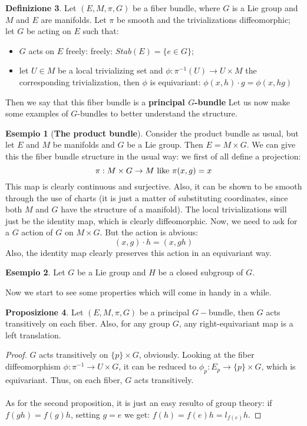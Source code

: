 \documentclass[12pt,a4paper]{report}
\theoremstyle{definition}
\newtheorem{Def}{Definizione}[chapter]
\theoremstyle{Theorem}
\newtheorem{Prop}[Def]{Proposizione}
\theoremstyle{definition}
\newtheorem{Ex}[Def]{Esempio}
\theoremstyle{definition}
\theoremstyle{definition}
\begin{document}
	\begin{Def}
		Let $(E,M,\pi,G)$ be a fiber bundle, where $G$ is a Lie group and $M$ and $E$ are manifolds. Let $\pi$ be smooth and the trivializations diffeomorphic; let $G$ be acting on $E$ such that:
		\begin{itemize}
			\item $G$ acts on $E$ freely: freely: $Stab(E)=\{e\in G\}$;
			\item let $U\in M$ be a local trivializing set and $\phi:\pi^{-1}(U)\rightarrow U\times M$  the corresponding trivialization, then $\phi$ is equivariant: $\phi(x,h)\cdot g=\phi(x,hg)$
		\end{itemize} 
		Then we say that this fiber bundle is a \textbf{principal $G$-bundle}
		 Let us now make some examples of $G$-bundles to better understand the structure.
		 \begin{Ex}[\textbf{The product bundle}]
		 	Consider the product bundle as usual, but let $E$ and $M$ be manifolds and $G$ be a Lie group. Then $E=M\times G$. We can give this the fiber bundle structure in the usual way: we first of all define a projection:
		 	$$\pi:M\times G\rightarrow M\hbox{ like }\pi(x,g)=x$$
		 	This map is clearly continuous and surjective. Also, it can be shown to be smooth through the use of charts (it is just a matter of substituting coordinates, since both $M$ and $G$ have the structure of a manifold). The local trivializations will just be the identity map, which is clearly diffeomorphic. Now, we need to ask for a $G$ action of $G$ on $M\times G$. But the action is abvious:
		 	$$(x,g)\cdot h=(x,gh)$$
		 	Also, the identity map clearly preserves this action in an equivariant way.
		 \end{Ex}
		 \begin{Ex}
		 	Let $G$ be a Lie group and $H$ be a closed subgroup of $G$.
		 \end{Ex}
	\end{Def}
	Now we start to see some properties which will come in handy in a while.
	\begin{Prop}
		Let $(E,M,\pi,G)$ be a principal $G-$bundle, then $G$ acts transitively on each fiber. Also, for any group $G$, any right-equivariant map is a left translation.
	\end{Prop}
	\begin{proof}
		$G$ acts transitively on $\{p\} \times G$, obviously. Looking at the fiber diffeomorphism $\phi:\pi^{-1}\rightarrow U\times G$, it can be reduced to $\phi_p:E_p\rightarrow \{p\}\times G$, which is equivariant. Thus, on each fiber, $G$ acts transitively.\\
		\\
		As for the second proposition, it is just an easy resulto of group theory: if $f(gh)=f(g)h$, setting $g=e$ we get: $f(h)=f(e)h=l_{f(e)}h$.
	\end{proof}
\end{document}
